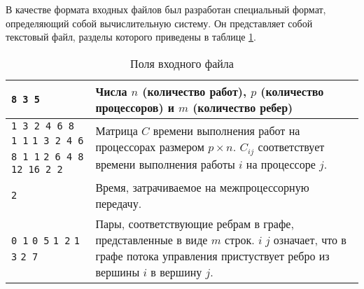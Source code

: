 В качестве формата входных файлов был разработан специальный формат, определяющий собой вычислительную систему. Он представляет собой текстовый файл, разделы которого приведены в таблице \ref{tbl:input-file-fields}.

\begin{table}
    \centering
    \begin{tabularx}{\textwidth}{|X|X|}
        \hline
        \texttt{8 3 5}                                                                                       & Числа $n$ (количество работ), $p$ (количество процессоров) и $m$ (количество ребер)                                                              \\
        \hline
        \texttt{1 3 2 4 6 8 1 1} \newline \texttt{1 3 2 4 6 8 1 1} \newline \texttt{2 6 4 8 12 16 2 2}       & Матрица $C$ времени выполнения работ на процессорах размером $p \times n$. $C_{ij}$ соответствует времени выполнения работы $i$ на процессоре $j$. \\
        \hline
        \texttt{2}                                                                                           & Время, затрачиваемое на межпроцессорную передачу.                                                                                                \\
        \hline
        \texttt{0 1} \newline \texttt{0 5} \newline \texttt{1 2} \newline \texttt{1 3} \newline \texttt{2 7} & Пары, соответствующие ребрам в графе, представленные в виде $m$ строк. $i\;j$ означает, что в графе потока управления пристуствует ребро из вершины $i$ в вершину $j$.                                                                                                                                            \\
        \hline
    \end{tabularx}
    \caption{Поля входного файла}
    \label{tbl:input-file-fields}
\end{table}

